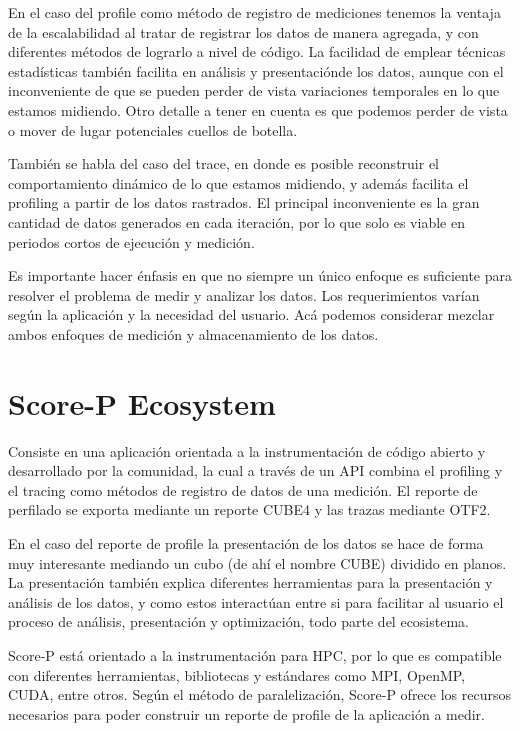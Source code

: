 \documentclass[conference]{IEEEtran}
\begin{document}
En el caso del profile como método de registro de mediciones tenemos la ventaja de la escalabilidad al tratar de registrar los datos de manera agregada, y con diferentes métodos de lograrlo a nivel de código. La facilidad de emplear técnicas estadísticas también facilita en análisis y presentaciónde los datos, aunque con el inconveniente de que se pueden perder de vista variaciones temporales en lo que estamos midiendo. Otro detalle a tener en cuenta es que podemos perder de vista o mover  de lugar potenciales cuellos de botella.

También se habla del caso del trace, en donde es posible reconstruir el comportamiento dinámico de lo que estamos midiendo, y además facilita el profiling a partir de los datos rastrados. El principal inconveniente es la gran cantidad de datos generados en cada iteración, por lo que solo es viable en periodos cortos de ejecución y medición.

Es importante hacer énfasis en que no siempre un único enfoque es suficiente para resolver el problema de medir y analizar los datos. Los requerimientos varían según la aplicación y la necesidad del usuario. Acá podemos considerar mezclar ambos enfoques de medición y almacenamiento de los datos.
\section{Score-P Ecosystem}
Consiste en una aplicación orientada a la instrumentación de código abierto y desarrollado por la comunidad, la cual a través de un API combina el profiling y el tracing como métodos de registro de datos de una medición. El reporte de perfilado se exporta mediante un reporte CUBE4 y las trazas mediante OTF2.

En el caso del reporte de profile la presentación de los datos se hace de forma muy interesante mediando un cubo (de ahí el nombre CUBE) dividido en planos. La presentación también explica diferentes herramientas para la presentación y análisis de los datos, y como estos interactúan entre si para facilitar al usuario el proceso de análisis, presentación y optimización, todo parte del ecosistema.

Score-P está orientado a la instrumentación para HPC, por lo que es compatible con diferentes herramientas, bibliotecas y estándares como MPI, OpenMP, CUDA, entre otros. Según el método de paralelización, Score-P ofrece los recursos necesarios para poder construir un reporte de profile de la aplicación a medir.

\end{document}
